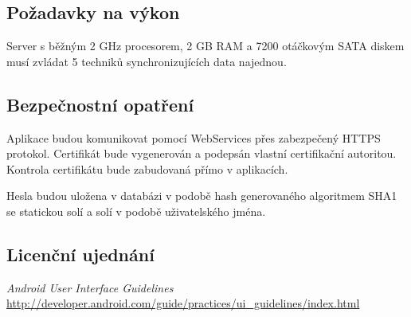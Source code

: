 \documentclass[a4paper,10pt]{article}
\begin{document}
\subsection{Požadavky na výkon}
Server s běžným 2 GHz procesorem, 2 GB RAM a 7200 otáčkovým SATA diskem musí zvládat 5 techniků synchronizujících data najednou.
\subsection{Bezpečnostní opatření}
Aplikace budou komunikovat pomocí WebServices přes zabezpečený HTTPS protokol. Certifikát bude vygenerován a podepsán vlastní certifikační autoritou. Kontrola certifikátu bude zabudovaná přímo v aplikacích.

Hesla budou uložena v databázi v podobě hash generovaného algoritmem SHA1 se statickou solí a solí v podobě uživatelského jména.
\subsection{Licenční ujednání}
\begin{thebibliography}{1}
	{\em Android User Interface Guidelines}	\url{http://developer.android.com/guide/practices/ui_guidelines/index.html}
\end{thebibliography}
\end{document}
